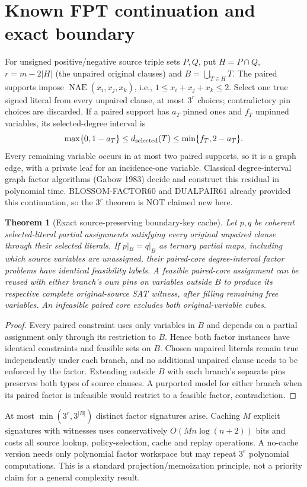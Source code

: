 \documentclass[11pt]{article}
\newtheorem{theorem}{Theorem}
\begin{document}
\section{Known FPT continuation and exact boundary}
For unsigned positive/negative source triple sets $P,Q$, put $H=P\cap Q$, $r=m-2|H|$ (the unpaired original clauses) and $B=\bigcup_{T\in H}T$. The paired supports impose $\operatorname{NAE}(x_i,x_j,x_k)$, i.e., $1\le x_i+x_j+x_k\le2$. Select one true signed literal from every unpaired clause, at most $3^r$ choices; contradictory pin choices are discarded. If a paired support has $a_T$ pinned ones and $f_T$ unpinned variables, its selected-degree interval is
\[
\max\{0,1-a_T\}\le d_{\rm selected}(T)\le\min\{f_T,2-a_T\}.
\]
Every remaining variable occurs in at most two paired supports, so it is a graph edge, with a private leaf for an incidence-one variable. Classical degree-interval graph factor algorithms (Gabow 1983) decide and construct this residual in polynomial time. BLOSSOM-FACTOR60 and DUALPAIR61 already provided this continuation, so the $3^r$ theorem is NOT claimed new here.
\begin{theorem}[Exact source-preserving boundary-key cache]
Let $p,q$ be coherent selected-literal partial assignments satisfying every original unpaired clause through their selected literals. If $p|_B=q|_B$ as \emph{ternary} partial maps, including which source variables are unassigned, their paired-core degree-interval factor problems have identical feasibility labels. A feasible paired-core assignment can be reused with either branch's own pins on variables outside $B$ to produce its respective complete original-source SAT witness, after filling remaining free variables. An infeasible paired core excludes both original-variable cubes.
\end{theorem}
\begin{proof}
Every paired constraint uses only variables in $B$ and depends on a partial assignment only through its restriction to $B$. Hence both factor instances have identical constraints and feasible sets on $B$. Chosen unpaired literals remain true independently under each branch, and no additional unpaired clause needs to be enforced by the factor. Extending outside $B$ with each branch's separate pins preserves both types of source clauses. A purported model for either branch when its paired factor is infeasible would restrict to a feasible factor, contradiction.
\end{proof}
At most $\min(3^r,3^{|B|})$ distinct factor signatures arise. Caching $M$ explicit signatures with witnesses uses conservatively $O(Mn\log(n+2))$ bits and costs all source lookup, policy-selection, cache and replay operations. A no-cache version needs only polynomial factor workspace but may repeat $3^r$ polynomial computations. This is a standard projection/memoization principle, not a priority claim for a general complexity result.
\end{document}
